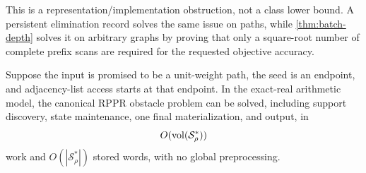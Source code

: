 This is a representation/implementation obstruction, not a class lower
bound.  A persistent elimination record solves the same issue on paths, while
\cref{thm:batch-depth} solves it on arbitrary graphs by proving that only a
square-root number of complete prefix scans are required for the requested
objective accuracy.

\begin{theorem}
\label{thm:path-ldl}
Suppose the input is promised to be a unit-weight path, the seed is an
endpoint, and adjacency-list access starts at that endpoint.  In the exact-real
arithmetic model, the canonical RPPR obstacle problem can be solved, including
support discovery, state maintenance, one final materialization, and output,
in
\begin{equation}
 O(\operatorname{vol}(\mathcal S_\rho^*))
 \label{eq:path-linear-work}
\end{equation}
work and $O(|\mathcal S_\rho^*|)$ stored words, with no global preprocessing.
\end{theorem}

